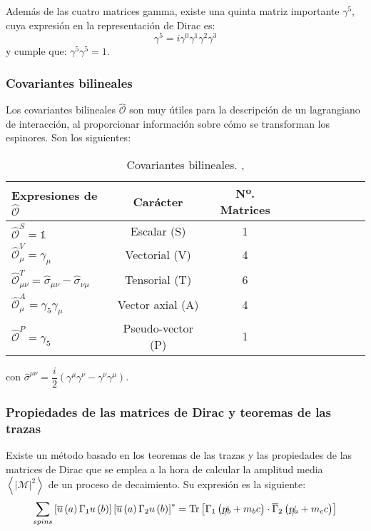 Además de las cuatro matrices gamma, existe una quinta matriz importante $\gamma^5$, cuya expresión en la representación de Dirac es:
\begin{equation}
\gamma^5 = i \gamma^0 \gamma^1 \gamma^2 \gamma^3\label{eq:gamma5}
\end{equation}
y cumple que: $\gamma^5 \gamma^5 = 1$.

\subsubsection{Covariantes bilineales}\label{sec:bilinearcov}
Los covariantes bilineales $\widehat{\mathcal{O}}$ son muy útiles para la descripción de un lagrangiano de interacción, al proporcionar información sobre cómo se transforman los espinores. Son los siguientes:

\begin{table}[h]
	\centering
	\begin{tabular}{l*{8}{c}r}
\hline
Expresiones de $\widehat{\mathcal{O}}$  & Carácter & Nº. Matrices\\ 
\hline
$\widehat{\mathcal{O}}^{S} = \mathbb{1}$ & Escalar (S) & 1\\
$\widehat{\mathcal{O}}_{\mu}^{V} = \gamma_{\mu}$ & Vectorial (V) & 4 &\\
$\widehat{\mathcal{O}}^{T}_{\mu\nu} = \hat{\sigma}_{\mu\nu}-\widehat{\sigma}_{\nu\mu}$ & Tensorial (T) & 6\\
$\widehat{\mathcal{O}}_{\mu}^{A} = \gamma_{5}\gamma_{\mu}$ & Vector axial (A) & 4\\
$\widehat{\mathcal{O}}^{P} = \gamma_{5}$ & Pseudo-vector (P) & 1\\
\hline
	\end{tabular}
\caption[Covariantes bilineales]{Covariantes bilineales. \cite{MCR}, \cite{GreinerRQM}}
\label{tab:bilinear_covariant}
\end{table}

con $\hat{\sigma}^{\mu\nu}= \dfrac{i}{2} \left(\gamma^{\mu}\gamma^{\nu} - \gamma^{\nu}\gamma^{\mu} \right)$.

\subsubsection{Propiedades de las matrices de Dirac y teoremas de las trazas}\label{sec:trazas}
Existe un método basado en los teoremas de las trazas y las propiedades de las matrices de Dirac que se emplea a la hora de calcular la amplitud media $\left\langle|\mathcal{M}|^2\right\rangle$ de un proceso de decaimiento. Su expresión es la siguiente:
\begin{equation}
\sum _{spins}\left[ \overline{u}\left( a\right) \Gamma_{1}u\left( b\right) \right] \left[ \overline{u}\left( a\right) \Gamma _{2}u\left( b\right) \right] ^{\ast }= \operatorname{Tr}\left[ \Gamma _{1}\left( \slashed{p_{b}}+m_{b}c\right) \cdot \overline{\Gamma }_{2}\left( \slashed{p_{a}}+m_{c}c\right) \right]\label{eq:casimir_trick}
\end{equation}

